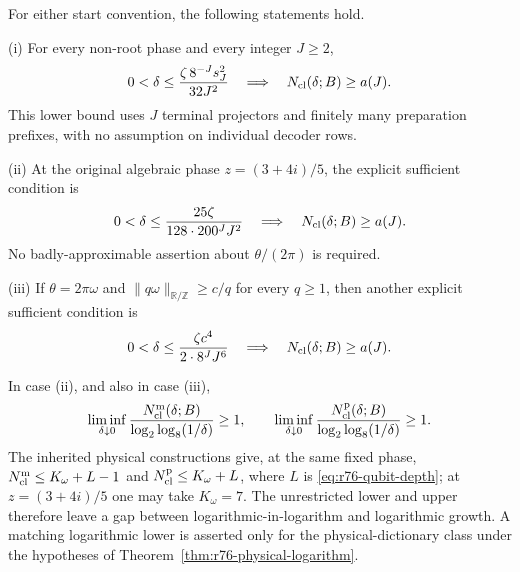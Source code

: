 \begin{theorem}
\label{thm:r77-unrestricted-qubit}
For either start convention, the following statements hold.

\smallskip\noindent
\textup{(i)} For every non-root phase and every integer $J\ge2$,
\begin{equation}\label{eq:r77-phase-memory}
 0<\delta\le\frac{\zeta\,8^{-J}s_J^2}{32J^2}
 \quad\Longrightarrow\quad N_{\rm cl}(\delta;B)\ge a(J).
\end{equation}
This lower bound uses $J$ terminal projectors and finitely many
preparation prefixes, with no assumption on individual decoder rows.

\smallskip\noindent
\textup{(ii)} At the original algebraic phase
$z=(3+4i)/5$, the explicit sufficient condition is
\begin{equation}\label{eq:r77-rational-phase-memory}
 0<\delta\le\frac{25\zeta}{128\cdot200^J J^2}
 \quad\Longrightarrow\quad N_{\rm cl}(\delta;B)\ge a(J).
\end{equation}
No badly-approximable assertion about $\theta/(2\pi)$ is required.

\smallskip\noindent
\textup{(iii)} If $\theta=2\pi\omega$ and
$\|q\omega\|_{\mathbb R/\mathbb Z}\ge c/q$ for every $q\ge1$,
then another explicit sufficient condition is
\begin{equation}\label{eq:r77-badly-approx-memory}
 0<\delta\le\frac{\zeta c^4}{2\cdot8^J J^6}
 \quad\Longrightarrow\quad N_{\rm cl}(\delta;B)\ge a(J).
\end{equation}

\smallskip\noindent
In case \textup{(ii)}, and also in case \textup{(iii)},
\begin{equation}\label{eq:r77-unrestricted-growth}
 \liminf_{\delta\downarrow0}
 \frac{N_{\rm cl}^{\rm m}(\delta;B)}
      {\log_2\log_8(1/\delta)}\ge1,
 \qquad
 \liminf_{\delta\downarrow0}
 \frac{N_{\rm cl}^{\rm p}(\delta;B)}
      {\log_2\log_8(1/\delta)}\ge1.
\end{equation}
The inherited physical constructions give, at the same fixed phase,
$N_{\rm cl}^{\rm m}\le K_\omega+L-1$ and
$N_{\rm cl}^{\rm p}\le K_\omega+L$, where $L$ is
\eqref{eq:r76-qubit-depth}; at $z=(3+4i)/5$ one may take $K_\omega=7$.
The unrestricted lower and upper therefore leave a gap between
logarithmic-in-logarithm and logarithmic growth.  A matching logarithmic
lower is asserted only for the physical-dictionary class under the
hypotheses of Theorem~\ref{thm:r76-physical-logarithm}.
\end{theorem}
